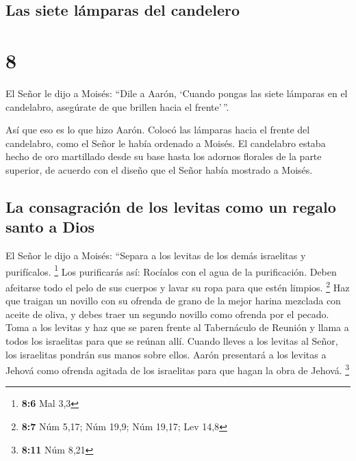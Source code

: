 \hypertarget{las-siete-luxe1mparas-del-candelero}{%
\subsection{Las siete lámparas del
candelero}\label{las-siete-luxe1mparas-del-candelero}}

\hypertarget{section-7}{%
\section{8}\label{section-7}}

 El Señor le dijo a Moisés:  ``Dile a Aarón,
`Cuando pongas las siete lámparas en el candelabro, asegúrate de que
brillen hacia el frente'\,''.

 Así que eso es lo que hizo Aarón. Colocó las lámparas
hacia el frente del candelabro, como el Señor le había ordenado a
Moisés.  El candelabro estaba hecho de oro martillado
desde su base hasta los adornos florales de la parte superior, de
acuerdo con el diseño que el Señor había mostrado a Moisés.

\hypertarget{la-consagraciuxf3n-de-los-levitas-como-un-regalo-santo-a-dios}{%
\subsection{La consagración de los levitas como un regalo santo a
Dios}\label{la-consagraciuxf3n-de-los-levitas-como-un-regalo-santo-a-dios}}

 El Señor le dijo a Moisés:  ``Separa a los
levitas de los demás israelitas y purifícalos. \footnote{\textbf{8:6}
  Mal 3,3}  Los purificarás así: Rocíalos con el agua de
la purificación. Deben afeitarse todo el pelo de sus cuerpos y lavar su
ropa para que estén limpios. \footnote{\textbf{8:7} Núm 5,17; Núm 19,9;
  Núm 19,17; Lev 14,8}  Haz que traigan un novillo con su
ofrenda de grano de la mejor harina mezclada con aceite de oliva, y
debes traer un segundo novillo como ofrenda por el pecado.
 Toma a los levitas y haz que se paren frente al
Tabernáculo de Reunión y llama a todos los israelitas para que se reúnan
allí.  Cuando lleves a los levitas al Señor, los
israelitas pondrán sus manos sobre ellos.  Aarón
presentará a los levitas a Jehová como ofrenda agitada de los israelitas
para que hagan la obra de Jehová. \footnote{\textbf{8:11} Núm 8,21}

